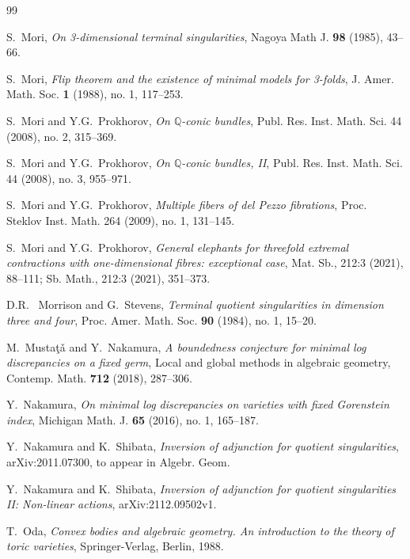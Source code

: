 \documentclass[11pt]{amsart}
\numberwithin{equation}{section}
\theoremstyle{definition}
\theoremstyle{definition}
\begin{document}
\begin{thebibliography}{99}

 S.~Mori, \textit{On 3-dimensional terminal singularities}, Nagoya Math J. \textbf{98} (1985), 43--66.

 S.~Mori, \textit{Flip theorem and the existence of minimal models for 3-folds}, J. Amer.
Math. Soc. \textbf{1} (1988), no. 1, 117--253.


 S.~Mori and Y.G.~Prokhorov,
\textit{On $\mathbb{Q}$-conic bundles}, 
Publ. Res. Inst. Math. Sci. 44 (2008), no. 2, 315--369. 


 S.~Mori and Y.G.~Prokhorov,
\textit{On $\mathbb{Q}$-conic bundles, II}, 
Publ. Res. Inst. Math. Sci. 44 (2008), no. 3, 955--971. 

 S.~Mori and Y.G.~Prokhorov, 
\textit{Multiple fibers of del Pezzo fibrations}, Proc. Steklov Inst. Math. 264 (2009), no. 1, 131--145.

 S.~Mori and Y.G.~Prokhorov, \textit{General elephants for threefold extremal contractions with one-dimensional fibres: exceptional case}, Mat. Sb., 212:3 (2021), 88--111; Sb. Math., 212:3 (2021), 351--373.

 D.R. ~Morrison and G.~Stevens, \textit{Terminal quotient singularities in dimension three and four}, Proc. Amer. Math. Soc. \textbf{90} (1984), no. 1, 15--20.

 M.~Musta\c{t}\v{a} and Y.~Nakamura, \textit{A boundedness conjecture for minimal log discrepancies on a fixed germ}, Local and global methods in algebraic geometry, Contemp. Math. \textbf{712} (2018), 287--306.

 Y.~Nakamura, \textit{On minimal log discrepancies on varieties with fixed Gorenstein index}, Michigan Math. J. \textbf{65} (2016), no. 1, 165--187.

 Y.~Nakamura and K.~Shibata, \textit{Inversion of adjunction for quotient singularities}, arXiv:2011.07300, to appear in Algebr. Geom.

 Y.~Nakamura and K.~Shibata, \textit{Inversion of adjunction for quotient singularities II: Non-linear actions}, arXiv:2112.09502v1.

 T.~Oda, \textit{Convex bodies and algebraic geometry. An introduction to the theory of toric varieties}, Springer-Verlag, Berlin, 1988.


\end{thebibliography}
\end{document}
